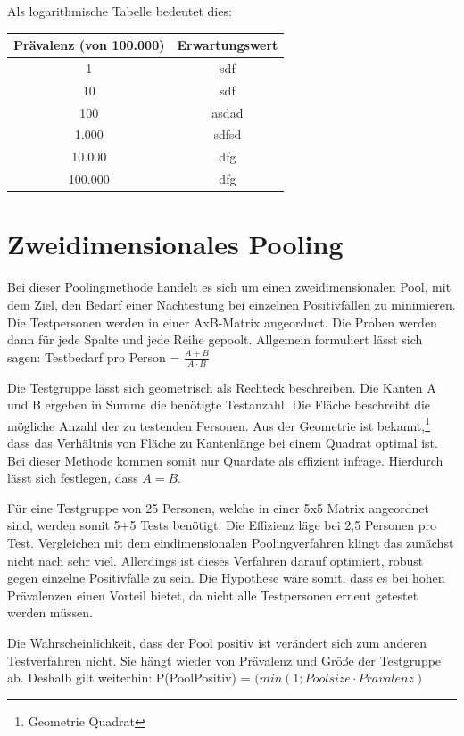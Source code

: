 Als logarithmische Tabelle bedeutet dies:

\begin{tabular}{|c|c|}
	\hline
	Prävalenz (von 100.000) & Erwartungswert \\
	\hline
	1 & sdf \\
	\hline
	10 & sdf \\
	\hline
	100 & asdad \\
	\hline
	1.000 & sdfsd \\
	\hline
	10.000 & dfg \\
	\hline
	100.000 & dfg \\
	\hline
\end{tabular}

\cleardoublepage
\section{Zweidimensionales Pooling}
Bei dieser Poolingmethode handelt es sich um einen zweidimensionalen Pool, mit dem Ziel, den Bedarf einer Nachtestung bei einzelnen Positivfällen zu minimieren.
Die Testpersonen werden in einer AxB-Matrix angeordnet.
Die Proben werden dann für jede Spalte und jede Reihe gepoolt.
Allgemein formuliert lässt sich sagen:
Testbedarf pro Person =
$\frac{A+B}{A\cdot B}$

Die Testgruppe lässt sich geometrisch als Rechteck beschreiben.
Die Kanten A und B ergeben in Summe die benötigte Testanzahl.
Die Fläche beschreibt die mögliche Anzahl der zu testenden Personen.
Aus der Geometrie ist bekannt,\footnote{Geometrie Quadrat}
dass das Verhältnis von Fläche zu Kantenlänge bei einem Quadrat optimal ist.
Bei dieser Methode kommen somit nur Quardate als effizient infrage.
Hierdurch lässt sich festlegen, dass $A=B$.

Für eine Testgruppe von 25 Personen, welche in einer 5x5 Matrix angeordnet sind, werden somit 5+5 Tests benötigt.
Die Effizienz läge bei 2,5 Personen pro Test.
Vergleichen mit dem eindimensionalen Poolingverfahren klingt das zunächst nicht nach sehr viel.
Allerdings ist dieses Verfahren darauf optimiert, robust gegen einzelne Positivfälle zu sein.
Die Hypothese wäre somit, dass es bei hohen Prävalenzen einen Vorteil bietet, da nicht alle Testpersonen erneut getestet werden müssen.

Die Wahrscheinlichkeit, dass der Pool positiv ist verändert sich zum anderen Testverfahren nicht.
Sie hängt wieder von Prävalenz und Größe der Testgruppe ab.
Deshalb gilt weiterhin:
P(PoolPositiv) = $(min\left(1;Poolsize\cdot Pravalenz\right)$

